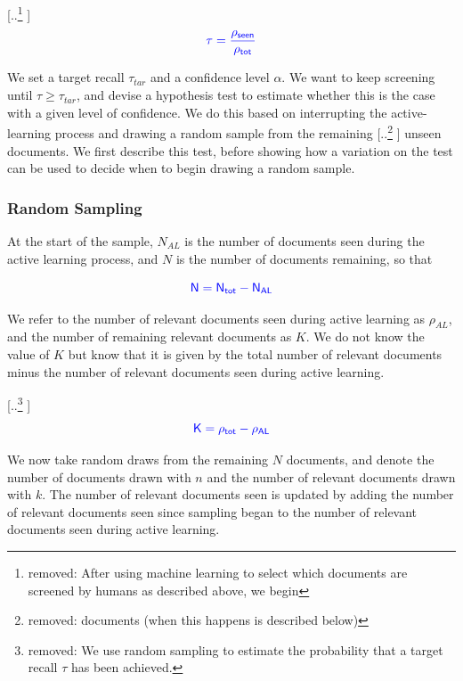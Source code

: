 \documentclass{bmcart}
\providecommand{\DIFadd}[1]{{\protect\color{blue} \sf #1}} %
\providecommand{\DIFdel}[1]{{\protect\color{red} [..\footnote{removed: #1} ]}} %
\providecommand{\DIFaddbegin}{} %
\providecommand{\DIFaddend}{} %
\providecommand{\DIFdelbegin}{} %
\providecommand{\DIFdelend}{} %
\newcommand{\DIFscaledelfig}{0.5}
\newlength{\DIFdelgraphicswidth} %
\newlength{\DIFdelgraphicsheight} %
\newcommand{\DIFaddincludegraphics}[2][]{{\color{blue}\fbox{\DIFOincludegraphics[#1]{#2}}}} %
\newcommand{\DIFdelincludegraphics}[2][]{%
\sbox{\DIFdelgraphicsbox}{\DIFOincludegraphics[#1]{#2}}%
\settoboxwidth{\DIFdelgraphicswidth}{\DIFdelgraphicsbox} %
\settoboxtotalheight{\DIFdelgraphicsheight}{\DIFdelgraphicsbox} %
\scalebox{\DIFscaledelfig}{%
\parbox[b]{\DIFdelgraphicswidth}{\usebox{\DIFdelgraphicsbox}\\[-\baselineskip] \rule{\DIFdelgraphicswidth}{0em}}\llap{\resizebox{\DIFdelgraphicswidth}{\DIFdelgraphicsheight}{%
\setlength{\unitlength}{\DIFdelgraphicswidth}%
\begin{picture}(1,1)%
\thicklines\linethickness{2pt} %
{\color[rgb]{1,0,0}\put(0,0){\framebox(1,1){}}}%
{\color[rgb]{1,0,0}\put(0,0){\line( 1,1){1}}}%
{\color[rgb]{1,0,0}\put(0,1){\line(1,-1){1}}}%
\end{picture}%
}\hspace*{3pt}}} %
} %
\DeclareRobustCommand{\DIFaddbegin}{\DIFOaddbegin \let\includegraphics\DIFaddincludegraphics} %
\DeclareRobustCommand{\DIFaddend}{\DIFOaddend \let\includegraphics\DIFOincludegraphics} %
\DeclareRobustCommand{\DIFdelbegin}{\DIFOdelbegin \let\includegraphics\DIFdelincludegraphics} %
\DeclareRobustCommand{\DIFdelend}{\DIFOaddend \let\includegraphics\DIFOincludegraphics} %
\begin{document}
	\DIFdelbegin \DIFdel{After using machine learning to select which documents are screened by humans as described above, we begin }\DIFdelend \DIFaddbegin \begin{equation}
	\DIFadd{\tau = \frac{\rho_{seen}}{\rho_{tot}}
	\label{eq:recall-def}
	}\end{equation}

	\DIFadd{We set a target recall $\tau_{tar}$ and a confidence level $\alpha$. 
	We want to keep screening until $\tau \geq \tau_{tar}$, and devise a hypothesis test to estimate whether this is the case with a given level of confidence. 
	We do this	based on interrupting the active-learning process and }\DIFaddend drawing a random sample from the remaining \DIFdelbegin \DIFdel{documents (when this happens is described below)}\DIFdelend \DIFaddbegin \DIFadd{unseen documents. 
	We first describe this test, before showing how a variation on the test can be used to decide when to begin drawing a random sample. 
	}

	\subsubsection*{\DIFadd{Random Sampling}}

	\DIFadd{At the start of the sample, $N_{AL}$ is the number of documents seen during the active learning process, and $N$ is the number of documents remaining, so that 
	}

	\begin{equation}
	\DIFadd{N = N_{tot} - N_{AL}
	}\end{equation} 

	\DIFadd{We refer to the number  of relevant documents seen during active learning as $\rho_{AL}$, and the number of remaining relevant documents as $K$. We do not know the value of $K$ but know that it is given by the total number of relevant documents minus the number of relevant documents seen during active learning}\DIFaddend .

	\DIFdelbegin \DIFdel{We use random sampling to estimate the probability that a target recall $\tau$ has been achieved. }\DIFdelend \DIFaddbegin \begin{equation}
	\DIFadd{K = \rho_{tot} - \rho_{AL}
	\label{eq:K}
	}\end{equation}

	\DIFadd{We now take random draws from the remaining $N$ documents, and denote the number of documents drawn with $n$ and the number of relevant documents drawn with $k$. The number of relevant documents seen is updated by adding the number of relevant documents seen since sampling began to the number of relevant documents seen during active learning.
	}
\end{document}
